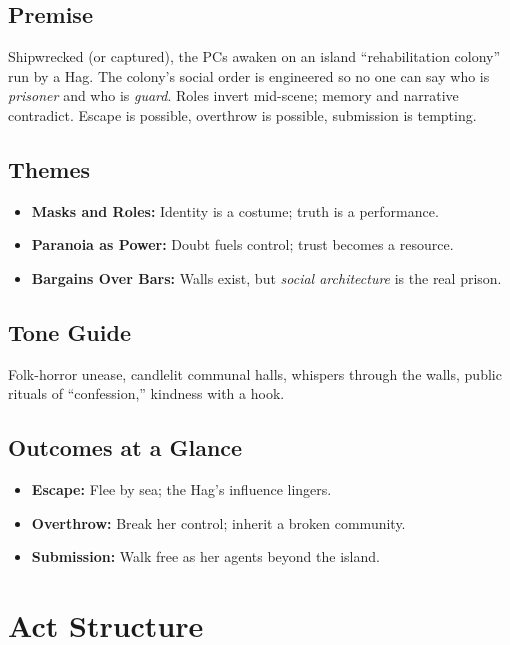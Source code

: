 \documentclass[11pt]{article}
\begin{document}
\subsection{Premise}
Shipwrecked (or captured), the PCs awaken on an island ``rehabilitation colony'' run by a Hag. The colony's social order is engineered so no one can say who is \emph{prisoner} and who is \emph{guard}. Roles invert mid-scene; memory and narrative contradict. Escape is possible, overthrow is possible, submission is tempting.

\subsection{Themes}
\begin{itemize}
  \item \textbf{Masks and Roles:} Identity is a costume; truth is a performance.
  \item \textbf{Paranoia as Power:} Doubt fuels control; trust becomes a resource.
  \item \textbf{Bargains Over Bars:} Walls exist, but \emph{social architecture} is the real prison.
\end{itemize}

\subsection{Tone Guide}
Folk-horror unease, candlelit communal halls, whispers through the walls, public rituals of ``confession,'' kindness with a hook.

\subsection{Outcomes at a Glance}
\begin{itemize}
  \item \textbf{Escape:} Flee by sea; the Hag's influence lingers.
  \item \textbf{Overthrow:} Break her control; inherit a broken community.
  \item \textbf{Submission:} Walk free as her agents beyond the island.
\end{itemize}

\section{Act Structure}
\end{document}
